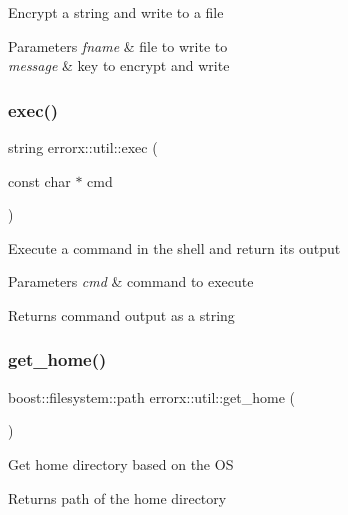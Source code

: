 Encrypt a string and write to a file


\begin{DoxyParams}{Parameters}
{\em fname} & file to write to \\
\hline
{\em message} & key to encrypt and write \\
\hline
\end{DoxyParams}
\mbox{\label{util_8hh_file_a79883d5134a18ccdf9acde504a5b735d}} 
\subsubsection{\texorpdfstring{exec()}{exec()}}
{\footnotesize\ttfamily string errorx\+::util\+::exec (\begin{DoxyParamCaption}\item[{const char $\ast$}]{cmd }\end{DoxyParamCaption})}

Execute a command in the shell and return its output


\begin{DoxyParams}{Parameters}
{\em cmd} & command to execute\\
\hline
\end{DoxyParams}
\begin{DoxyReturn}{Returns}
command output as a string 
\end{DoxyReturn}
\mbox{\label{util_8hh_file_adca61ce66f8a3bf65a941f50177cfa9c}} 
\subsubsection{\texorpdfstring{get\+\_\+home()}{get\_home()}}
{\footnotesize\ttfamily boost\+::filesystem\+::path errorx\+::util\+::get\+\_\+home (\begin{DoxyParamCaption}{ }\end{DoxyParamCaption})\hspace{0.3cm}{\ttfamily [inline]}}

Get home directory based on the OS

\begin{DoxyReturn}{Returns}
path of the home directory 
\end{DoxyReturn}
\mbox{\label{util_8hh_file_a4cec107c2b54f9cc7661fbeab8f814fb}} 
